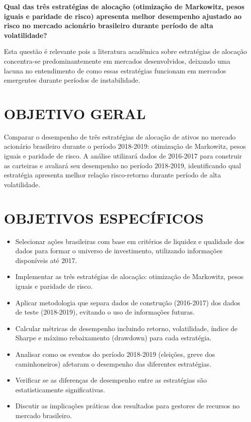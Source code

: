 \textbf{Qual das três estratégias de alocação (otimização de Markowitz, pesos iguais e paridade de risco) apresenta melhor desempenho ajustado ao risco no mercado acionário brasileiro durante período de alta volatilidade?}

Esta questão é relevante pois a literatura acadêmica sobre estratégias de alocação concentra-se predominantemente em mercados desenvolvidos, deixando uma lacuna no entendimento de como essas estratégias funcionam em mercados emergentes durante períodos de instabilidade.

\section{OBJETIVO GERAL}

Comparar o desempenho de três estratégias de alocação de ativos no mercado acionário brasileiro durante o período 2018-2019: otimização de Markowitz, pesos iguais e paridade de risco. A análise utilizará dados de 2016-2017 para construir as carteiras e avaliará seu desempenho no período 2018-2019, identificando qual estratégia apresenta melhor relação risco-retorno durante período de alta volatilidade.

\section{OBJETIVOS ESPECÍFICOS}

\begin{itemize}
    \item Selecionar ações brasileiras com base em critérios de liquidez e qualidade dos dados para formar o universo de investimento, utilizando informações disponíveis até 2017.

    \item Implementar as três estratégias de alocação: otimização de Markowitz, pesos iguais e paridade de risco.

    \item Aplicar metodologia que separa dados de construção (2016-2017) dos dados de teste (2018-2019), evitando o uso de informações futuras.

    \item Calcular métricas de desempenho incluindo retorno, volatilidade, índice de Sharpe e máximo rebaixamento (drawdown) para cada estratégia.

    \item Analisar como os eventos do período 2018-2019 (eleições, greve dos caminhoneiros) afetaram o desempenho das diferentes estratégias.

    \item Verificar se as diferenças de desempenho entre as estratégias são estatisticamente significativas.

    \item Discutir as implicações práticas dos resultados para gestores de recursos no mercado brasileiro.
\end{itemize}

